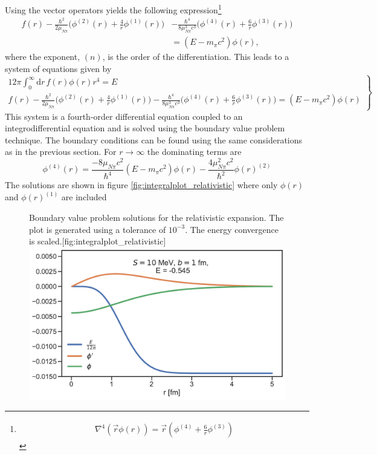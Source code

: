 Using the vector operators yields the following expression\footnote{\begin{align*}
		\nabla^4(\vec{r}\phi(r))=\vec{r}\left(\phi^{(4)}+\frac{6}{r}\phi^{(3)}\right)
\end{align*}}
\begin{equation}\begin{split}
		f(r)-\frac{\hbar^2}{2\mu_{N\pi}}\bigg( \phi^{(2)}(r)+\frac{4}{r}\phi^{(1)}(r) \bigg)&-\frac{\hbar^4}{8\mu_{N\pi}^3 c^3}\bigg(\phi^{(4)}(r)+\frac{6}{r}\phi^{(3)}(r)\bigg) \\
		&=(E-m_\pi c^2)\phi(r),
	\end{split}
\end{equation}
where the exponent, $(n)$, is the order of the differentiation. This leads to a system of equations given by
\begin{equation}\label{systemrel}
	\left.
	\begin{array}{ll}
		12\pi \int_0^\infty  \text{d}r \, f(r) \phi(r) r^4  = E \\
		f(r)-\frac{\hbar^2}{2\mu_{N\pi}}\big( \phi^{(2)}(r)+\frac{4}{r}\phi^{(1)}(r) \big)-\frac{\hbar^4}{8\mu_{N\pi}^3 c^3}\big(\phi^{(4)}(r)+\frac{6}{r}\phi^{(3)}(r)\big)=(E-m_\pi c^2)\phi(r)
	\end{array}
	\right \} 
\end{equation}
This system is a fourth-order differential equation coupled to an integrodifferential equation and is solved using the boundary value problem technique. The boundary conditions can be found using the same considerations as in the previous section. For $r\rightarrow \infty$ the dominating terms are 
\begin{equation}
	\phi^{(4)}(r) = \frac{-8\mu_{N\pi}c^2}{\hbar^4}(E-m_\pi c^2)\phi(r)-\frac{4\mu^2_{N\pi}c^2}{\hbar^2}\phi(r)^{(2)}
\end{equation}
The solutions are shown in figure \ref{fig:integralplot_relativistic} where only $\phi(r)$ and $\phi(r)^{(1)}$ are included
\begin{figure}[H]
	\begin{sidecaption}{Boundary value problem solutions for the relativistic expansion. The plot is generated using a tolerance of $10^{-3}$. The energy convergence is scaled.}[fig:integralplot_relativistic]
		\includegraphics[width=\linewidth]{Figures/Integralplot_relativistic.pdf}
	\end{sidecaption}
\end{figure}

